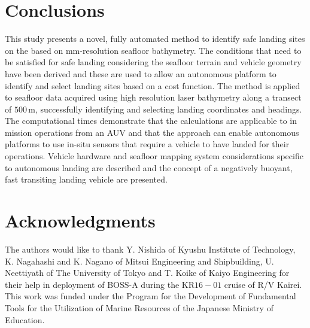 \section{Conclusions}

This study presents a novel, fully automated method to identify safe landing sites on the based on mm-resolution seafloor bathymetry. The conditions that need to be satisfied for safe landing considering the seafloor terrain and vehicle geometry have been derived and these are used to allow an autonomous platform to identify and select landing sites based on a cost function. The method is applied to seafloor data acquired using high resolution laser bathymetry along a transect of $500$\,m, successfully identifying and selecting landing coordinates and headings. The computational times demonstrate that the calculations are applicable to in mission operations from an AUV and that the approach can enable autonomous platforms to use in-situ sensors that require a vehicle to have landed for their operations. Vehicle hardware and seafloor mapping system considerations specific to autonomous landing are described and the concept of a negatively buoyant, fast transiting landing vehicle are presented.


\section*{Acknowledgments}

The authors would like to thank Y. Nishida of Kyushu Institute of Technology, K. Nagahashi and K. Nagano of Mitsui Engineering and Shipbuilding, U. Neettiyath of The University of Tokyo and T. Koike of Kaiyo Engineering for their help in deployment of BOSS-A during the KR$16-01$ cruise of R/V Kairei. This work was funded under the Program for the Development of Fundamental Tools for the Utilization of Marine Resources of the Japanese Ministry of Education.
